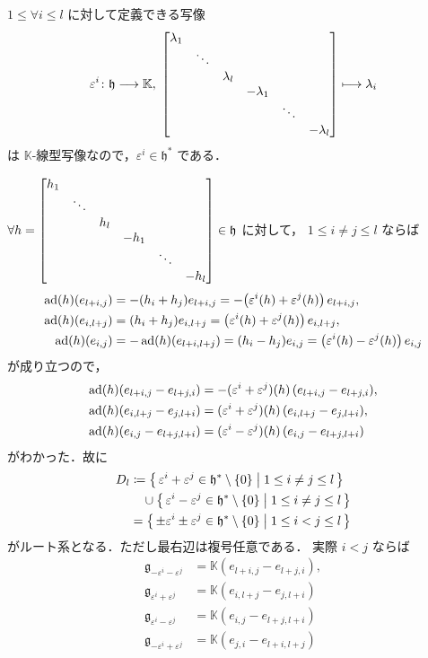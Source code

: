 \documentclass{ltjsarticle}
\theoremstyle{mystyle} %
\numberwithin{equation}{section}
\newcommand{\lto}{\longrightarrow}
\newcommand{\lmto}{\longmapsto}
\begin{document}
$1 \le \forall i \le l$ に対して定義できる写像
\begin{align}
    \varepsilon^i \colon \mathfrak{h} \lto \mathbb{K},\; \mqty[\dmat{\lambda_1,\ddots,\lambda_{l},-\lambda_{1},\ddots,-\lambda_{l}}] \lmto \lambda_i
\end{align}
は $\mathbb{K}$-線型写像なので，$\varepsilon^i \in \mathfrak{h}^*$ である．

$\forall h = \mqty[\dmat{h_1,\ddots,h_{l},-h_{1},\ddots,-h_{l}}] \in \mathfrak{h}$ に対して，
$1 \le i \neq j \le l$ ならば
\begin{align}
    \operatorname{ad}(h)(e_{l+i,j}) &= -(h_i + h_j) e_{l+i,j} = -\bigl(\varepsilon^i(h) + \varepsilon^j(h)\bigr)\, e_{l+i,j}, \\
    \operatorname{ad}(h)(e_{i,l+j}) &= (h_i + h_j) e_{i,l+j} = \bigl(\varepsilon^i(h) + \varepsilon^j(h)\bigr)\, e_{i,l+j}, \\
    \operatorname{ad}(h)(e_{i,j}) &= - \operatorname{ad}(h)(e_{l+i,l+j}) = (h_i - h_j) e_{i,j} = \bigl(\varepsilon^i(h) - \varepsilon^j(h)\bigr)\,e_{i,j}
\end{align}
が成り立つので，
\begin{align}
    \operatorname{ad}(h)(e_{l+i,j} - e_{l+j,i}) &= -(\varepsilon^i + \varepsilon^j)(h)\, (e_{l+i,j} - e_{l+j,i}), \\
    \operatorname{ad}(h)(e_{i,l+j} - e_{j,l+i}) &= (\varepsilon^i + \varepsilon^j)(h)\, (e_{i,l+j} - e_{j,l+i}), \\
    \operatorname{ad}(h)(e_{i,j} - e_{l+j,l+i}) &= (\varepsilon^i - \varepsilon^j)(h)\, (e_{i,j} - e_{l+j,l+i})
\end{align}
がわかった．故に
\begin{align}
    D_l
    &\coloneqq 
    \bigl\{\, \varepsilon^i + \varepsilon^j \in \mathfrak{h}^* \setminus \{0\} \bigm| 1 \le i \neq j \le l \,\bigr\} \\
    &\quad \cup \bigl\{\, \varepsilon^i - \varepsilon^j \in \mathfrak{h}^* \setminus \{0\} \bigm| 1 \le i \neq j \le l \,\bigr\} \\
    &= \bigl\{\, \pm \varepsilon^i \pm \varepsilon^j \in \mathfrak{h}^* \setminus \{0\} \bigm| 1 \le i < j \le l \,\bigr\}
\end{align}
がルート系となる．ただし最右辺は複号任意である．
実際 $i < j$ ならば
\begin{align}
    \mathfrak{g}_{-\varepsilon^i-\varepsilon^j} &= \mathbb{K}(e_{l+i,j} - e_{l+j,i}), \\
    \mathfrak{g}_{\varepsilon^i+\varepsilon^j} &= \mathbb{K}(e_{i,l+j} - e_{j,l+i}) \\
    \mathfrak{g}_{\varepsilon^i-\varepsilon^j} &= \mathbb{K}(e_{i,j} - e_{l+j,l+i}) \\
    \mathfrak{g}_{-\varepsilon^i+\varepsilon^j} &= \mathbb{K}(e_{j,i} - e_{l+i,l+j})
\end{align}
\end{document}
